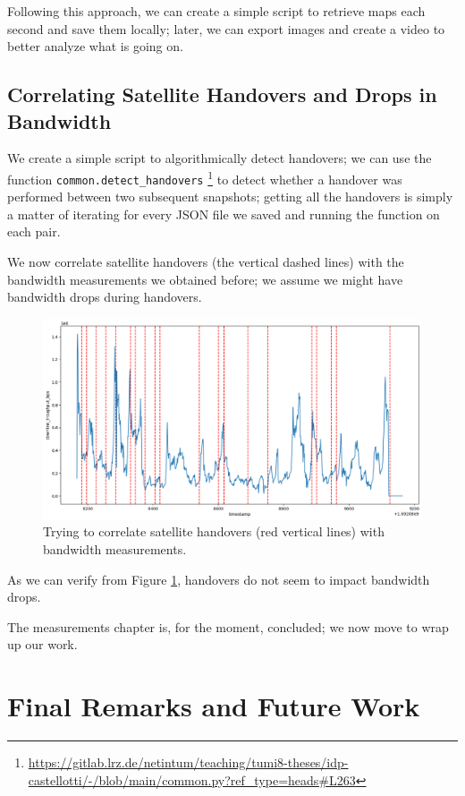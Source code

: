 \documentclass[IN,11pt,twoside,openright,idp,english]{tumthesis}
\begin{document}
Following this approach, we can create a simple script to retrieve maps each second and save them locally; later, we can export images and create a video to better analyze what is going on. 

\section{Correlating Satellite Handovers and Drops in Bandwidth}
\label{sec:sat-hand-drop}

We create a simple script to algorithmically detect handovers; we can use the function \texttt{common.detect\_handovers} \footnote{\url{https://gitlab.lrz.de/netintum/teaching/tumi8-theses/idp-castellotti/-/blob/main/common.py?ref_type=heads\#L263}} to detect whether a handover was performed between two subsequent snapshots; getting all the handovers is simply a matter of iterating for every JSON file we saved and running the function on each pair.

We now correlate satellite handovers (the vertical dashed lines) with the bandwidth measurements we obtained before; we assume we might have bandwidth drops during handovers. 

\begin{figure}
    \centering
    \includegraphics[width=1\columnwidth]{img/correlation_handovers_bw.png}
    \caption{Trying to correlate satellite handovers (red vertical lines) with bandwidth measurements.}
    \label{fig:vis-correlation-handovers}
\end{figure}

As we can verify from Figure \ref{fig:vis-correlation-handovers}, handovers do not seem to impact bandwidth drops.

The measurements chapter is, for the moment, concluded; we now move to wrap up our work.


\chapter{Final Remarks and Future Work}
\end{document}
